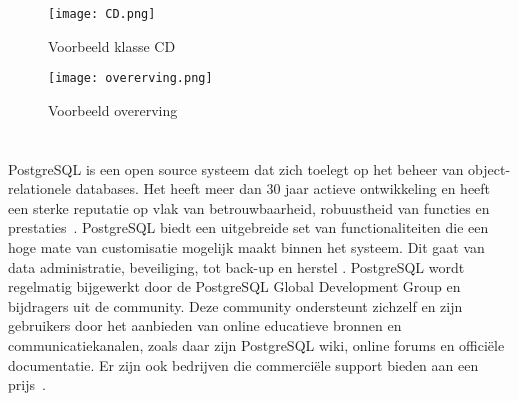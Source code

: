 \begin{figure}[!h]
    \centering
    \texttt{[image: CD.png]}
    \caption{Voorbeeld klasse CD}
    \label{fig:Voorbeeld klasse CD}
\end{figure}

\begin{figure}[!h]
    \centering
    \texttt{[image: overerving.png]}
    \caption{Voorbeeld overerving}
    \label{fig:Voorbeeld overerving}
\end{figure}


\section{}
\label{sec:PostgreSQL}


PostgreSQL is een open source systeem dat zich toelegt op het beheer van object-relationele databases. Het heeft meer dan 30 jaar actieve ontwikkeling en heeft een sterke reputatie op vlak van betrouwbaarheid, robuustheid van functies en prestaties~\autocite{postgres}. PostgreSQL biedt een uitgebreide set van functionaliteiten die een hoge mate van customisatie mogelijk maakt binnen het systeem. Dit gaat van data administratie, beveiliging, tot back-up en herstel . PostgreSQL wordt regelmatig bijgewerkt door de PostgreSQL Global Development Group en bijdragers uit de community. Deze community ondersteunt zichzelf en zijn gebruikers door het aanbieden van online educatieve bronnen en communicatiekanalen, zoals daar zijn PostgreSQL wiki, online forums en officiële documentatie. Er zijn ook bedrijven die commerciële support bieden aan een prijs~\autocite{Nethosting2019}. 

